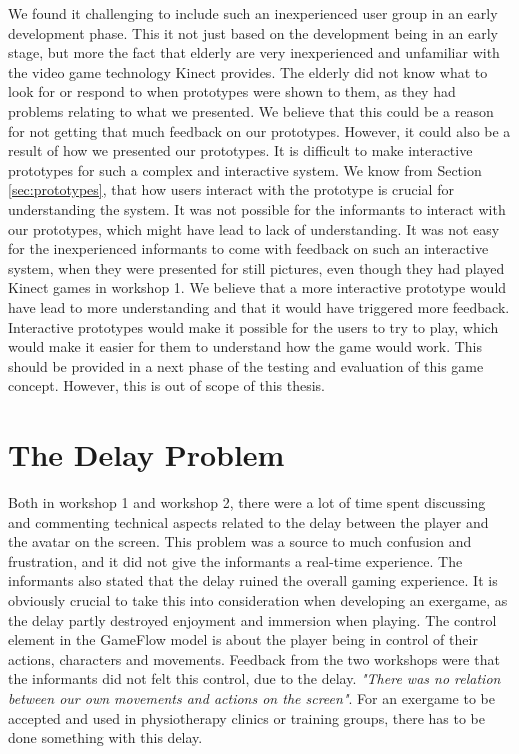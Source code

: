We found it challenging to include such an inexperienced user group in an early development phase. This it not just based on the development being in an early stage, but more the fact that elderly are very inexperienced and unfamiliar with the video game technology Kinect provides. The elderly did not know what to look for or respond to when prototypes were shown to them, as they had problems relating to what we presented. We believe that this could be a reason for not getting that much feedback on our prototypes. However, it could also be a result of how we presented our prototypes. It is difficult to make interactive prototypes for such a complex and interactive system. We know from Section \ref{sec:prototypes}, that how users interact with the prototype is crucial for understanding the system. It was not possible for the informants to interact with our prototypes, which might have lead to lack of understanding. It was not easy for the inexperienced informants to come with feedback on such an interactive system, when they were presented for still pictures, even though they had played Kinect games in workshop 1. We believe that a more interactive prototype would have lead to more understanding and that it would have triggered more feedback. Interactive prototypes would make it possible for the users to try to play, which would make it easier for them to understand how the game would work. This should be provided in a next phase of the testing and evaluation of this game concept. However, this is out of scope of this thesis. 
 
\section{The Delay Problem}
\label{sec:delay}
Both in workshop 1 and workshop 2, there were a lot of time spent discussing and commenting technical aspects related to the delay between the player and the avatar on the screen. This problem was a source to much confusion and frustration, and it did not give the informants a real-time experience. The informants also stated that the delay ruined the overall gaming experience. It is obviously crucial to take this into consideration when developing an exergame, as the delay partly destroyed enjoyment and immersion when playing. The control element in the GameFlow model \cite{sweetser} is about the player being in control of their actions, characters and movements. Feedback from the two workshops were that the informants did not felt this control, due to the delay. \emph{"There was no relation between our own movements and actions on the screen"}. For an exergame to be accepted and used in physiotherapy clinics or training groups, there has to be done something with this delay. 

